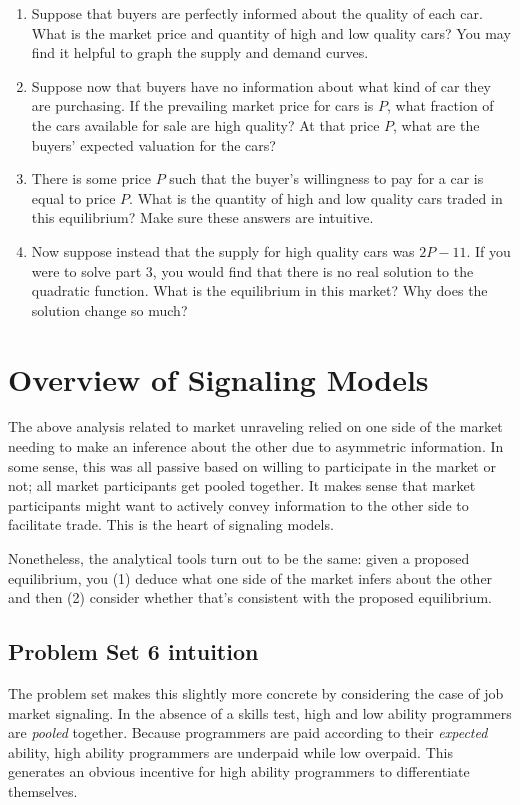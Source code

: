 \documentclass[letter,12pt]{article}
\begin{document}
\begin{enumerate}
	\item Suppose that buyers are perfectly informed about the quality of each car. What is the market price
	and quantity of high and low quality cars? You may find it helpful to graph the supply and demand
	curves.
	\item Suppose now that buyers have no information about what kind of car they are purchasing. If the
	prevailing market price for cars is $P$, what fraction of the cars available for sale are high quality? At
	that price $P$, what are the buyers’ expected valuation for the cars?
	\item There is some price $P$ such that the buyer’s willingness to pay for a car is equal to price $P$. What is the
	quantity of high and low quality cars traded in this equilibrium? Make sure these answers are intuitive.
	\item Now suppose instead that the supply for high quality cars was $2P - 11$. If you were to solve part 3,
	you would find that there is no real solution to the quadratic function. What is the equilibrium in this
	market? Why does the solution change so much?
\end{enumerate}


\section{Overview of Signaling Models}

The above analysis related to market unraveling relied on one side of the market needing to make an inference about the other due to asymmetric information. In some sense, this was all passive based on willing to participate in the market or not; all market participants get pooled together. It makes sense that market participants might want to actively convey information to the other side to facilitate trade. This is the heart of signaling models.

Nonetheless, the analytical tools turn out to be the same: given a proposed equilibrium, you (1) deduce what one side of the market infers about the other and then (2) consider whether that's consistent with the proposed equilibrium.


\subsection{Problem Set 6 intuition}

The problem set makes this slightly more concrete by considering the case of job market signaling. In the absence of a skills test, high and low ability programmers are \textit{pooled} together. Because programmers are paid according to their \textit{expected} ability, high ability programmers are underpaid while low overpaid. This generates an obvious incentive for high ability programmers to differentiate themselves.
\end{document}
